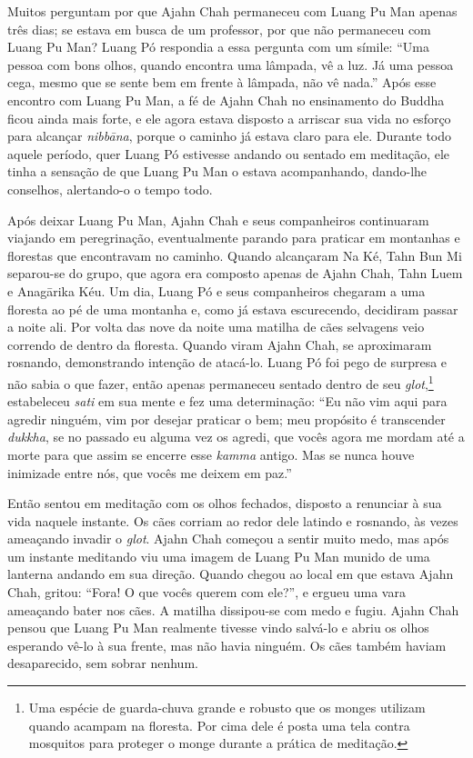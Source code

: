 Muitos perguntam por que Ajahn Chah permaneceu com Luang Pu Man apenas
três dias; se estava em busca de um professor, por que não permaneceu
com Luang Pu Man? Luang Pó respondia a essa pergunta com um símile:
``Uma pessoa com bons olhos, quando encontra uma lâmpada, vê a luz. Já
uma pessoa cega, mesmo que se sente bem em frente à lâmpada, não vê
nada.'' Após esse encontro com Luang Pu Man, a fé de Ajahn Chah no
ensinamento do Buddha ficou ainda mais forte, e ele agora estava
disposto a arriscar sua vida no esforço para alcançar \emph{nibbāna},
porque o caminho já estava claro para ele. Durante todo aquele período,
quer Luang Pó estivesse andando ou sentado em meditação, ele tinha a
sensação de que Luang Pu Man o estava acompanhando, dando-lhe conselhos,
alertando-o o tempo todo.

Após deixar Luang Pu Man, Ajahn Chah e seus companheiros continuaram
viajando em peregrinação, eventualmente parando para praticar em
montanhas e florestas que encontravam no caminho. Quando alcançaram Na
Ké, Tahn Bun Mi separou-se do grupo, que agora era composto apenas de
Ajahn Chah, Tahn Luem e Anagārika Kéu. Um dia, Luang Pó e seus
companheiros chegaram a uma floresta ao pé de uma montanha e, como já
estava escurecendo, decidiram passar a noite ali. Por volta das nove da
noite uma matilha de cães selvagens veio correndo de dentro da floresta.
Quando viram Ajahn Chah, se aproximaram rosnando, demonstrando intenção
de atacá-lo. Luang Pó foi pego de surpresa e não sabia o que fazer,
então apenas permaneceu sentado dentro de seu \emph{glot},\footnote{Uma
  espécie de guarda-chuva grande e robusto que os monges utilizam quando
  acampam na floresta. Por cima dele é posta uma tela contra mosquitos
  para proteger o monge durante a prática de meditação.} estabeleceu
\emph{sati} em sua mente e fez uma determinação: ``Eu não vim aqui para
agredir ninguém, vim por desejar praticar o bem; meu propósito é
transcender \emph{dukkha}, se no passado eu alguma vez os agredi, que
vocês agora me mordam até a morte para que assim se encerre esse
\emph{kamma} antigo. Mas se nunca houve inimizade entre nós, que vocês
me deixem em paz.''

Então sentou em meditação com os olhos fechados, disposto a renunciar à
sua vida naquele instante. Os cães corriam ao redor dele latindo e
rosnando, às vezes ameaçando invadir o \emph{glot}. Ajahn Chah começou a
sentir muito medo, mas após um instante meditando viu uma imagem de
Luang Pu Man munido de uma lanterna andando em sua direção. Quando
chegou ao local em que estava Ajahn Chah, gritou: ``Fora! O que vocês
querem com ele?'', e ergueu uma vara ameaçando bater nos cães. A matilha
dissipou-se com medo e fugiu. Ajahn Chah pensou que Luang Pu Man
realmente tivesse vindo salvá-lo e abriu os olhos esperando vê-lo à sua
frente, mas não havia ninguém. Os cães também haviam desaparecido, sem
sobrar nenhum.

